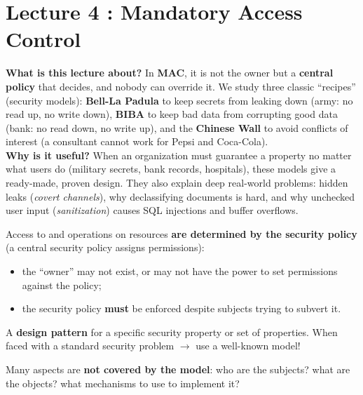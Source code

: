\chapter{Lecture 4 : Mandatory Access Control}

\begin{rembox}[title=In a nutshell]
\textbf{What is this lecture about?} In \textbf{MAC}, it is not the owner but a
\textbf{central policy} that decides, and nobody can override it. We study three classic
``recipes'' (security models): \textbf{Bell-La Padula} to keep secrets from leaking down
(army: no read up, no write down), \textbf{BIBA} to keep bad data from corrupting good
data (bank: no read down, no write up), and the \textbf{Chinese Wall} to avoid conflicts
of interest (a consultant cannot work for Pepsi and Coca-Cola). \\
\textbf{Why is it useful?} When an organization must guarantee a property no matter what
users do (military secrets, bank records, hospitals), these models give a ready-made,
proven design. They also explain deep real-world problems: hidden leaks (\emph{covert
channels}), why declassifying documents is hard, and why unchecked user input
(\emph{sanitization}) causes SQL injections and buffer overflows.
\end{rembox}

\begin{defnbox}[title=Mandatory Access Control (MAC)]
Access to and operations on resources \textbf{are determined by the security policy}
(a central security policy assigns permissions):
\begin{itemize}
  \item the ``owner'' may not exist, or may not have the power to set permissions
        against the policy;
  \item the security policy \textbf{must} be enforced despite subjects trying to
        subvert it.
\end{itemize}
\end{defnbox}

\begin{defnbox}[title=Security model]
A \textbf{design pattern} for a specific security property or set of properties. When
faced with a standard security problem $\to$ use a well-known model!
\end{defnbox}

\begin{warnbox}[title=The devil is in the details]
Many aspects are \textbf{not covered by the model}: who are the subjects? what are the
objects? what mechanisms to use to implement it?
\end{warnbox}

